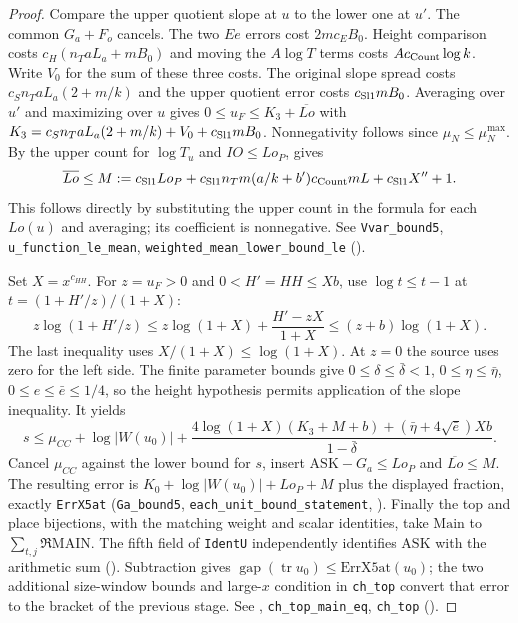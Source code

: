 \begin{proof}
Compare the upper quotient slope at $u$ to the lower one at $u'$.
The common $G_a+F_o$ cancels. The two $Ee$ errors cost $2mc_EB_0$.
Height comparison costs $c_H(n_TaL_a+mB_0)$ and moving the $A\log T$
terms costs $A c_{\rm Count}\log k$. Write $V_0$ for the sum of these three
costs. The original slope spread costs $c_Sn_TaL_a(2+m/k)$ and the
upper quotient error costs $c_{\rm Sl1}mB_0$. Averaging over $u'$ and
maximizing over $u$ gives $0\le u_F\le K_3+\overline{Lo}$ with
$K_3=c_Sn_TaL_a(2+m/k)+V_0+c_{\rm Sl1}mB_0$.
Nonnegativity follows since $\mu_N\le\mu_N^{\max}$.
By the upper count for $\log T_u$ and $IO\le Lo_P$,  gives
\[
 \overline{Lo}\le M:=c_{\rm Sl1}Lo_P+
 c_{\rm Sl1}n_Tm(a/k+b')c_{\rm Count}mL+c_{\rm Sl1}X''+1 .
\]
This follows directly by substituting the upper count in the formula
for each $Lo(u)$ and averaging; its coefficient is nonnegative.
See \nolinkurl{Vvar_bound5}, \nolinkurl{u_function_le_mean},
\nolinkurl{weighted_mean_lower_bound_le}
().

Set $X=x^{c_{HH}}$. For $z=u_F>0$ and $0<H'=HH\le Xb$, use
$\log t\le t-1$ at $t=(1+H'/z)/(1+X)$:
\[
 z\log(1+H'/z)\le z\log(1+X)+\frac{H'-zX}{1+X}
 \le(z+b)\log(1+X).
\]
The last inequality uses $X/(1+X)\le\log(1+X)$.
At $z=0$ the source uses zero for the left side. The finite parameter bounds
give $0\le\delta\le\bar\delta<1$, $0\le\eta\le\bar\eta$,
$0\le e\le\bar e\le1/4$, so the height hypothesis permits application of
the slope inequality. It yields
\[
 s\le\mu_{CC}+\log|W(u_0)|+
 \frac{4\log(1+X)(K_3+M+b)+(\bar\eta+4\sqrt{\bar e})Xb}{1-\bar\delta}.
\]
Cancel $\mu_{CC}$ against the lower bound for $s$, insert
$\mathrm{ASK}-G_a\le Lo_P$ and $\overline{Lo}\le M$.
The resulting error is $K_0+\log|W(u_0)|+Lo_P+M$ plus the displayed
fraction, exactly \nolinkurl{ErrX5at}
(\nolinkurl{Ga_bound5}, \nolinkurl{each_unit_bound_statement},
).
Finally the top and place bijections, with the matching weight and scalar
identities, take $\mathrm{Main}$ to $\sum_{t,j}\Re\mathrm{MAIN}$.
The fifth field of \nolinkurl{IdentU} independently identifies $\mathrm{ASK}$
with the arithmetic sum (). Subtraction gives
$\operatorname{gap}(\operatorname{tr}u_0)\le\mathrm{ErrX5at}(u_0)$;
the two additional size-window bounds and large-$x$ condition in
\nolinkurl{ch_top} convert that error to the bracket of the previous stage.
See , \nolinkurl{ch_top_main_eq}, \nolinkurl{ch_top}
().
\end{proof}
